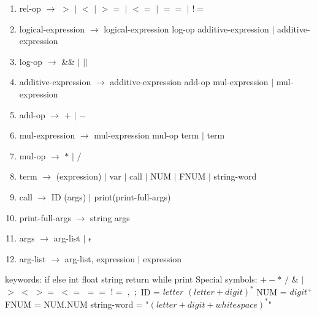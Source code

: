 \documentclass{article}
\begin{document}
\begin{enumerate}
    \item rel-op $\rightarrow$ $>$ $|$ $<$ $|$ $>=$ $|$ $<=$ $|$ $==$ $|$ $!=$
    \item logical-expression $\rightarrow$ logical-expression log-op additive-expression $|$ additive-expression
    \item log-op $\rightarrow$ \&\& $|$ $||$
    \item additive-expression $\rightarrow$ additive-expression add-op mul-expression $|$ mul-expression
    \item add-op $\rightarrow$ $+$ $|$ $-$
    \item mul-expression $\rightarrow$ mul-expression mul-op term $|$ term
    \item mul-op $\rightarrow$ $*$ $|$ $/$
    \item term $\rightarrow$ (expression) $|$ var $|$ call $|$ NUM $|$ FNUM $|$ string-word
    \item call $\rightarrow$ ID (args) $|$ print(print-full-args)
    \item print-full-args $\rightarrow$ string args
    \item args $\rightarrow$ arg-list $|$ $\epsilon$
    \item arg-list $\rightarrow$ arg-list, expression $|$ expression
\end{enumerate}

keywords: if else int float string return while print \newline
Special symbols: $+ - *$ $/$ \& $|$ $>$ $<$ $>=$ $<=$ $==$ $!=$ $,$ $;$\newline
ID = $letter$ $(letter + digit)^*$ \newline
NUM = $digit^+$ \newline
FNUM = NUM.NUM \newline
string-word = "$(letter + digit + whitespace)^*$"
\end{document}
